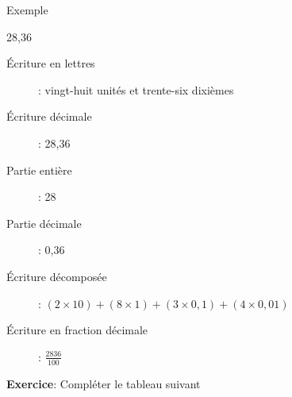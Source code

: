 \documentclass[12pt,a4paper]{article}
\begin{document}
\begin{definition}{Exemple}
\begin{center}
28,36
\end{center}
\begin{description}
\item[Écriture en lettres]: vingt-huit unités et trente-six dixièmes
\item[Écriture décimale]: 28,36
\item[Partie entière]: 28
\item[Partie décimale]: 0,36
\item[Écriture décomposée]: $ (2\times 10) + (8\times 1) + (3\times 0,1) + (4\times 0,01) $
\item[Écriture en fraction décimale]: $\displaystyle\frac{2836}{100}$
\end{description}
\end{definition}

\textbf{Exercice}: Compléter le tableau suivant
\end{document}
